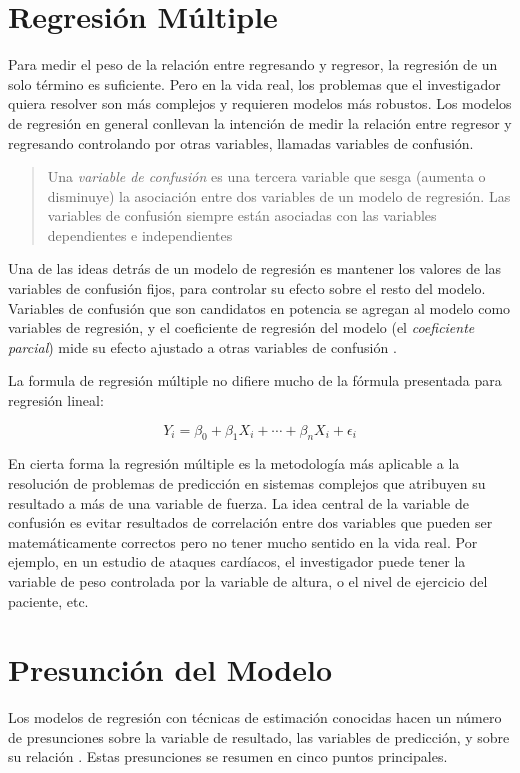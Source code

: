 \documentclass[letterpaper, spanish, 11pt]{report}
\begin{document}
\section{Regresión Múltiple}
Para medir el peso de la relación entre regresando y regresor, la regresión de un solo término es suficiente. Pero en la vida real, los problemas que el investigador quiera resolver son más complejos y requieren modelos más robustos.  Los modelos de regresión en general conllevan la intención de medir la relación entre regresor y regresando controlando por otras variables, llamadas variables de confusión.

\begin{quotation}
	Una \emph{variable de confusión} es una tercera variable que sesga (aumenta o disminuye) la asociación entre dos variables de un modelo de regresión. Las variables de confusión siempre están asociadas con las variables dependientes e independientes \cite{daroczi}
\end{quotation}

Una de las ideas detrás de un modelo de regresión es mantener los valores de las variables de confusión fijos, para controlar su efecto sobre el resto del modelo. Variables de confusión que son candidatos en potencia se agregan al modelo como variables de regresión, y el coeficiente de regresión del modelo (el \emph{coeficiente parcial}) mide su efecto ajustado a otras variables de confusión \cite{daroczi}.

La formula de regresión múltiple no difiere mucho de la fórmula presentada para regresión lineal:

\begin{equation}
Y_{i} = \beta_{0} + \beta_{1}X_{i} + \cdots + \beta_{n}X_{i} + \epsilon_{i}
\end{equation}

En cierta forma la regresión múltiple es la metodología más aplicable a la resolución de problemas de predicción en sistemas complejos que atribuyen su resultado a más de una variable de fuerza. La idea central de la variable de confusión es evitar resultados de correlación entre dos variables que pueden ser matemáticamente correctos pero no tener mucho sentido en la vida real. Por ejemplo, en un estudio de ataques cardíacos, el investigador puede tener la variable de peso controlada por la variable de altura, o el nivel de ejercicio del paciente, etc.

\section{Presunción del Modelo}
Los modelos de regresión con técnicas de estimación conocidas hacen un número de presunciones sobre la variable de resultado, las variables de predicción, y sobre su relación \cite{daroczi}. Estas presunciones se resumen en cinco puntos principales.
\end{document}
